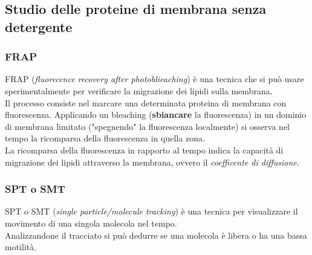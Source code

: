     \subsection{Studio delle proteine di membrana senza detergente}
        \subsubsection{FRAP}
            FRAP (\textit{fluorecence recovery after photoblieaching}) è una tecnica che si può usare sperimentalmente per verificare la migrazione dei lipidi sulla membrana. \\
            Il processo consiste nel marcare una determinata proteina di membrana con fluorescenza. Applicando un bleaching (\textbf{sbiancare} la fluorescenza) in un dominio di membrana limitato ("spegnendo" la fluorescenza localmente) si osserva nel tempo la ricomparsa della fluorescenza in quella zona.\\
            La ricomparsa della fluorescenza in rapporto al tempo indica la capacità di migrazione dei lipidi attraverso la membrana, ovvero il \textit{coefficente di diffusione}.
        \subsubsection{SPT o SMT}
            SPT o SMT (\textit{single particle/molecule tracking}) è una tecnica per visualizzare il movimento di una singola molecola nel tempo.\\
            Analizzandone il tracciato si può dedurre se una molecola è libera o ha una bassa motilità.
        
\pagebreak